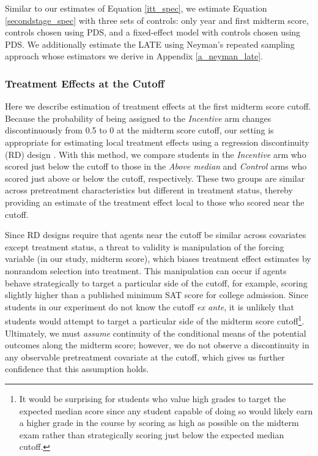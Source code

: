 \documentclass[12pt]{article}
\begin{document}
Similar to our estimates of Equation \ref{itt_spec}, we estimate Equation \ref{secondstage_spec} with three sets of controls: only year and first midterm score, controls chosen using PDS, and a fixed-effect model with controls chosen using PDS. We additionally estimate the LATE using Neyman's repeated sampling approach whose estimators we derive in Appendix \ref{a_neyman_late}.

\subsubsection{Treatment Effects at the Cutoff}

Here we describe estimation of treatment effects at the first midterm score cutoff. Because the probability of being assigned to the \textit{Incentive} arm changes discontinuously from 0.5 to 0 at the midterm score cutoff, our setting is appropriate for estimating local treatment effects using a regression discontinuity (RD) design \citep{tc1960, ap2008, il2008}. With this method, we compare students in the \textit{Incentive} arm who scored just below the cutoff to those in the \textit{Above median} and \textit{Control} arms who scored just above or below the cutoff, respectively. These two groups are similar across pretreatment characteristics but different in treatment status, thereby providing an estimate of the treatment effect local to those who scored near the cutoff.

Since RD designs require that agents near the cutoff be similar across covariates except treatment status, a threat to validity is manipulation of the forcing variable (in our study, midterm score), which biases treatment effect estimates by nonrandom selection into treatment. This manipulation can occur if agents behave strategically to target a particular side of the cutoff, for example, scoring slightly higher than a published minimum SAT score for college admission. Since students in our experiment do not know the cutoff \textit{ex ante}, it is unlikely that students would attempt to target a particular side of the midterm score cutoff\footnote{It would be surprising for students who value high grades to target the expected median score since any student capable of doing so would likely earn a higher grade in the course by scoring as high as possible on the midterm exam rather than strategically scoring just below the expected median cutoff.}. Ultimately, we must \textit{assume} continuity of the conditional means of the potential outcomes along the midterm score; however, we do not observe a discontinuity in any observable pretreatment covariate at the cutoff, which gives us further confidence that this assumption holds.
\end{document}
